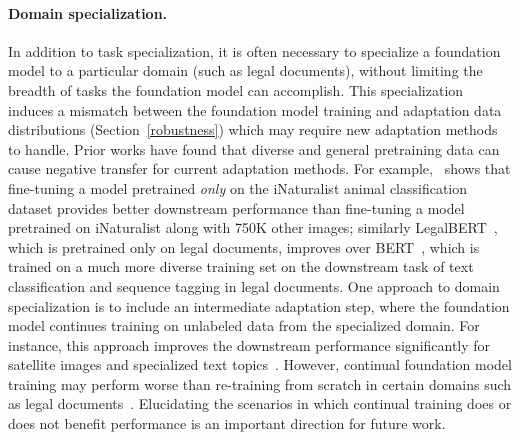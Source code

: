 \paragraph{Domain specialization.} In addition to task specialization, it is often necessary to specialize a foundation model to a particular domain (such as legal documents), without limiting the breadth of tasks the foundation model can accomplish. This specialization induces a mismatch between the foundation model training and adaptation data distributions (Section~\ref{robustness}) which may require new adaptation methods to handle. Prior works have found that diverse and general pretraining data can cause negative transfer for current adaptation methods. For example,~\citet{cole2021contrastive} shows that fine-tuning a model pretrained \textit{only} on the iNaturalist animal classification dataset provides better downstream performance than fine-tuning a model pretrained on iNaturalist along with 750K other images; similarly LegalBERT~\citep{chalkidis2020legal}, which is pretrained only on legal documents, improves over BERT~\citep{devlin2019bert}, which is trained on a much more diverse training set on the downstream task of text classification and sequence tagging in legal documents. One approach to domain specialization is to include an intermediate adaptation step, where the foundation model continues training on unlabeled data from the specialized domain. For instance, this approach improves the downstream performance significantly for satellite images and specialized text topics~\citep{reed2021selfsupervised,gururangan2020dont}. However, continual foundation model training may perform worse than re-training from scratch in certain domains such as legal documents~\citep{chalkidis2020legal}. Elucidating the scenarios in which continual training does or does not benefit performance is an important direction for future work.

